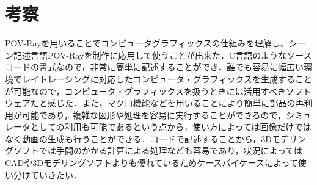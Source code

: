 \documentclass[a4j,dvipdfmx,uplatex,11pt]{jsarticle}
\begin{document}
\clearpage

\section{考察}
POV-Rayを用いることでコンピュータグラフィックスの仕組みを理解し、シーン記述言語POV-Rayを制作に応用して使うことが出来た．C言語のようなソースコードの書式なので，非常に簡単に記述することができ，誰でも容易に幅広い環境でレイトレーシングに対応したコンピュータ・グラフィックスを生成することが可能なので，コンピュータ・グラフィックスを扱うときには活用すべきソフトウェアだと感じた．また，マクロ機能などを用いることにより簡単に部品の再利用が可能であり，複雑な図形や処理を容易に実行することができるので，シミュレータとしての利用も可能であるという点から，使い方によっては画像だけではなく動画の生成も行うことができる．コードで記述することから，3Dモデリングソフトでは手間のかかる計算による処理なども容易であり，状況によってはCADや3Dモデリングソフトよりも優れているためケースバイケースによって使い分けていきたい．
\end{document}
